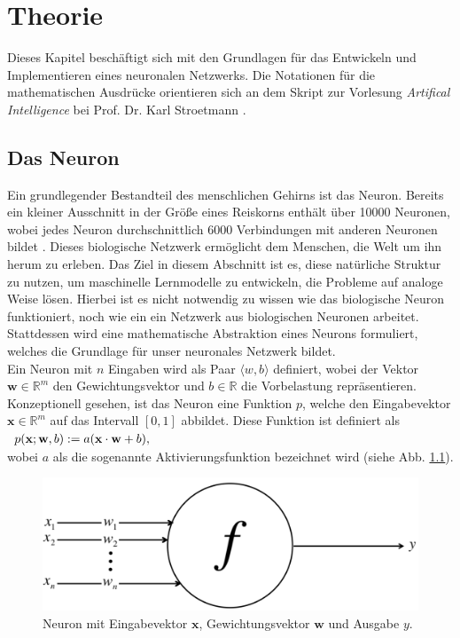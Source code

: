 \chapter{Theorie}
Dieses Kapitel beschäftigt sich mit den Grundlagen für das Entwickeln und Implementieren eines neuronalen Netzwerks. Die Notationen für die mathematischen Ausdrücke orientieren sich an dem Skript zur Vorlesung \textit{Artifical Intelligence} bei Prof. Dr. Karl Stroetmann \cite{stroetmann:2017}.

\section{Das Neuron}
\label{chap:sigmoid}
Ein grundlegender Bestandteil des menschlichen Gehirns ist das Neuron. Bereits ein kleiner Ausschnitt in der Größe eines Reiskorns enthält über 10000 Neuronen, wobei jedes Neuron durchschnittlich 6000 Verbindungen mit anderen Neuronen bildet \cite{buduma:2017}. Dieses biologische Netzwerk ermöglicht dem Menschen, die Welt um ihn herum zu erleben. Das Ziel in diesem Abschnitt ist es, diese natürliche Struktur zu nutzen, um maschinelle Lernmodelle zu entwickeln, die Probleme auf analoge Weise lösen. Hierbei ist es nicht notwendig zu wissen wie das biologische Neuron funktioniert, noch wie ein ein Netzwerk aus biologischen Neuronen arbeitet. Stattdessen wird eine mathematische Abstraktion eines Neurons formuliert, welches die Grundlage für unser neuronales Netzwerk bildet. \\
Ein Neuron mit $n$ Eingaben wird als Paar $\langle w,b \rangle$ definiert, wobei der Vektor $\mathbf{w} \in \mathbb{R}^m$ den Gewichtungsvektor und $b \in \mathbb{R}$ die Vorbelastung repräsentieren. Konzeptionell gesehen, ist das Neuron eine Funktion $p$, welche den Eingabevektor $\mathbf{x} \in \mathbb{R}^m$ auf das Intervall $[0,1]$ abbildet. Diese Funktion ist definiert als \\[0.2cm]
\hspace*{1.3cm}
$
\begin{array}[t]{lclll}
	p(\mathbf{x};\mathbf{w},b) := a(\mathbf{x}\cdot\mathbf{w}+b),
\end{array}
$
\\[0.2cm]
wobei $a$ als die sogenannte Aktivierungsfunktion bezeichnet wird (siehe Abb. \ref{fig:perceptron}).
\begin{figure}[hbt]
	\centering
	\includegraphics[scale=0.25]{Bilder/sigmoid_neuron}
	\caption{Neuron mit Eingabevektor $\mathbf{x}$, Gewichtungsvektor $\mathbf{w}$ und Ausgabe $y$. \cite{buduma:2017}} 
	\label{fig:perceptron} 
\end{figure}

